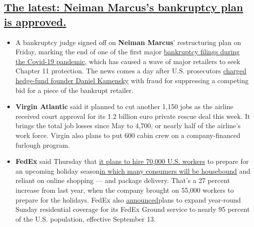 \hypertarget{the-latest-neiman-marcuss-bankruptcy-plan-is-approved}{%
\subsection{\texorpdfstring{\protect\hyperlink{the-latest-neiman-marcuss-bankruptcy-plan-is-approved}{The
latest: Neiman Marcus's bankruptcy plan is
approved.}}{The latest: Neiman Marcus's bankruptcy plan is approved.}}\label{the-latest-neiman-marcuss-bankruptcy-plan-is-approved}}

\begin{itemize}
\item
  A bankruptcy judge signed off on \textbf{Neiman Marcus}' restructuring
  plan on Friday, marking the end of one of the first major
  \href{https://www.nytimes3xbfgragh.onion/2020/05/07/business/neiman-marcus-bankruptcy.html}{bankruptcy
  filings during the Covid-19 pandemic}, which has caused a wave of
  major retailers to seek Chapter 11 protection. The news comes a day
  after U.S. prosecutors
  \href{https://www.nytimes3xbfgragh.onion/live/2020/09/03/business/stock-market-today-coronavirus/a-hedge-fund-manager-is-accused-of-securities-fraud-related-to-the-neiman-marcus-bankruptcy}{charged
  hedge-fund founder Daniel Kamensky} with fraud for suppressing a
  competing bid for a piece of the bankrupt retailer.
\item
  \textbf{Virgin Atlantic} said it planned to cut another 1,150 jobs as
  the airline received court approval for its 1.2 billion euro private
  rescue deal this week. It brings the total job losses since May to
  4,700, or nearly half of the airline's work force. Virgin also plans
  to put 600 cabin crew on a company-financed furlough program.
\item
  \textbf{FedEx} said Thursday that
  \href{https://www.nytimes3xbfgragh.onion/live/2020/09/03/business/stock-market-today-coronavirus/fedex-to-hire-27-percent-more-workers-than-last-year-for-holiday-season}{it
  plans to hire 70,000 U.S. workers} to prepare for an upcoming holiday
  season\href{https://www.nytimes3xbfgragh.onion/2020/09/02/business/retailers-holiday-shopping.html}{in
  which many consumers will be housebound} and reliant on online
  shopping --- and package delivery. That's a 27 percent increase from
  last year, when the company brought on 55,000 workers to prepare for
  the holidays. FedEx also
  \href{https://newsroom.fedex.com/newsroom/fedex-enhancements-position-company-ahead-of-a-record-setting-peak-season/}{announced}plans
  to expand year-round Sunday residential coverage for its FedEx Ground
  service to nearly 95 percent of the U.S. population, effective
  September 13.
\end{itemize}


